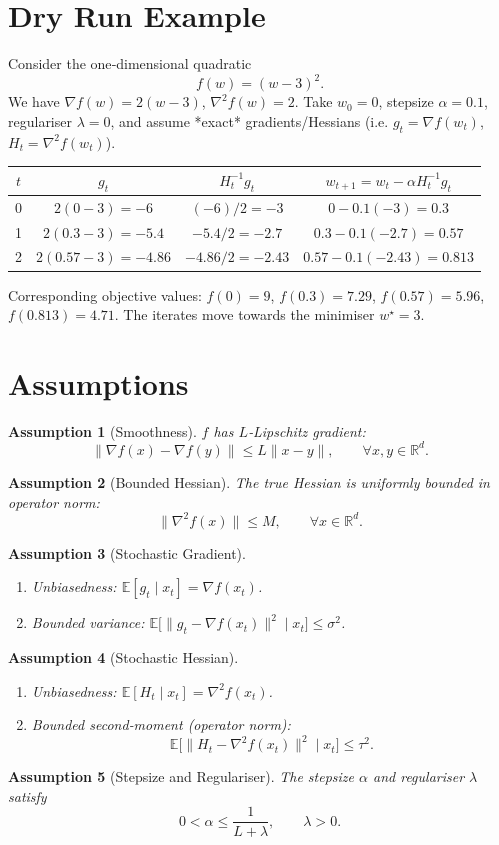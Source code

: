 \documentclass{article}
\newtheorem{assumption}{Assumption}
\newcommand{\EE}{\mathbb{E}}
\newcommand{\RR}{\mathbb{R}}
\begin{document}
\section*{Dry Run Example}
Consider the one‑dimensional quadratic
\[
f(w)=(w-3)^2 .
\]
We have $\nabla f(w)=2(w-3)$, $\nabla^2 f(w)=2$.
Take $w_0=0$, stepsize $\alpha=0.1$, regulariser $\lambda=0$,
and assume *exact* gradients/Hessians (i.e. $g_t=\nabla f(w_t)$,
$H_t=\nabla^2 f(w_t)$).

\begin{center}
\begin{tabular}{c|c|c|c}
$t$ & $g_t$ & $H_t^{-1}g_t$ & $w_{t+1}=w_t-\alpha H_t^{-1}g_t$ \\ \hline
0 & $2(0-3)=-6$ & $(-6)/2=-3$ & $0-0.1(-3)=0.3$ \\
1 & $2(0.3-3)=-5.4$ & $-5.4/2=-2.7$ & $0.3-0.1(-2.7)=0.57$ \\
2 & $2(0.57-3)=-4.86$ & $-4.86/2=-2.43$ & $0.57-0.1(-2.43)=0.813$ \\
\end{tabular}
\end{center}
Corresponding objective values:
$f(0)=9$, $f(0.3)=7.29$, $f(0.57)=5.96$, $f(0.813)=4.71$.
The iterates move towards the minimiser $w^\star=3$.

\newpage
\section*{Assumptions}
\begin{assumption}[Smoothness]
$f$ has $L$‑Lipschitz gradient:
\[
\|\nabla f(x)-\nabla f(y)\|\le L\|x-y\|,\qquad\forall x,y\in\RR^{d}.
\tag{A1}
\]
\end{assumption}
\begin{assumption}[Bounded Hessian]
The true Hessian is uniformly bounded in operator norm:
\[
\|\nabla^2 f(x)\|\le M,\qquad\forall x\in\RR^{d}.
\tag{A2}
\]
\end{assumption}
\begin{assumption}[Stochastic Gradient]
\begin{enumerate}
\item Unbiasedness: $\EE[g_t\mid x_t]=\nabla f(x_t)$.
\item Bounded variance: $\EE\bigl[\|g_t-\nabla f(x_t)\|^{2}\mid x_t\bigr]\le\sigma^{2}$.
\end{enumerate}
\end{assumption}
\begin{assumption}[Stochastic Hessian]
\begin{enumerate}
\item Unbiasedness: $\EE[H_t\mid x_t]=\nabla^{2}f(x_t)$.
\item Bounded second‑moment (operator norm):
\[
\EE\bigl[\|H_t-\nabla^{2}f(x_t)\|^{2}\mid x_t\bigr]\le\tau^{2}.
\]
\end{enumerate}
\end{assumption}
\begin{assumption}[Stepsize and Regulariser]
The stepsize $\alpha$ and regulariser $\lambda$ satisfy
\[
0<\alpha\le\frac{1}{L+\lambda},\qquad \lambda>0.
\tag{A5}
\]
\end{assumption}
\end{document}
